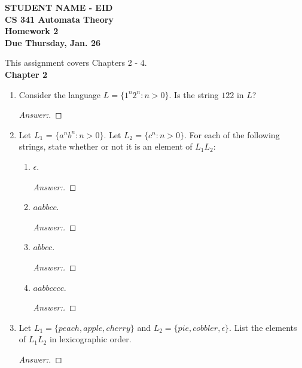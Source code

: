 \documentclass[10pt]{article}
\newcommand{\chtitle}[1]{\noindent \vspace{5mm}\textbf{Chapter #1}\vspace{3mm}}
\begin{document}
\begin{flushleft}
\textbf{STUDENT NAME - EID \\
CS 341 Automata Theory \\
Homework 2 \\
Due Thursday, Jan. 26}
\end{flushleft}
This assignment covers Chapters 2 - 4. \\

\chtitle{2}

\begin{enumerate}


\item
Consider the language $L = \{1^n2^n: n > 0\}$.  Is the string $122$ in $L$?
\begin{proof}[Answer:]
\end{proof}


\item
Let $L_1$ = $\{a^nb^n: n > 0\}$.  Let $L_2 = \{c^n: n > 0\}$.  For each of the following strings, state whether or not it is an element of $L_1L_2$:
\begin{enumerate}

\item
$\epsilon$.
\begin{proof}[Answer:]
\end{proof}

\item
$aabbcc$.
\begin{proof}[Answer:]
\end{proof}

\item
$abbcc$.
\begin{proof}[Answer:]
\end{proof}

\item
$aabbcccc$.
\begin{proof}[Answer:]
\end{proof}
\end{enumerate}


\item
Let $L_1 = \{peach, apple, cherry\}$ and $L_2 = \{pie, cobbler, \epsilon\}$.  List the elements of $L_1L_2$ in lexicographic order.
\begin{proof}[Answer:]
\end{proof}


\end{enumerate}
\end{document}
